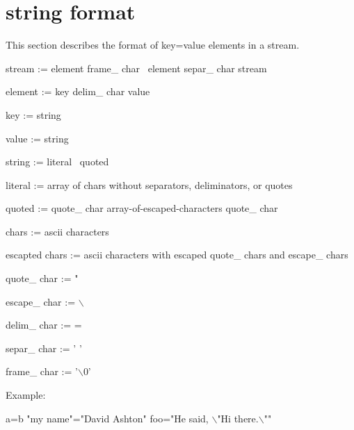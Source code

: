 \documentclass{article}
\begin{document}
\section{string format}
This section describes the format of key=value elements in a stream.

stream := element frame\_ char \vline\ element separ\_ char stream

element := key delim\_ char value

key := string

value := string

string := literal \vline\ quoted

literal := array of chars without separators, deliminators, or quotes

quoted := quote\_ char array-of-escaped-characters quote\_ char

chars := ascii characters

escapted chars := ascii characters with escaped quote\_ chars and escape\_ chars

quote\_ char := "

escape\_ char := $\backslash$

delim\_ char := =

separ\_ char := ' '

frame\_ char := '$\backslash$0'

Example:

	a=b "my name"="David Ashton" foo="He said, $\backslash$"Hi there.$\backslash$""
	
\end{document}
